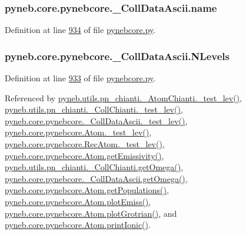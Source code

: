 \hypertarget{classpyneb_1_1core_1_1pynebcore_1_1___coll_data_ascii_a39c9697691d3e8e8d7f99c05e0baa4a9}{
\subsubsection[{name}]{\setlength{\rightskip}{0pt plus 5cm}pyneb.\-core.\-pynebcore.\-\_\-\-Coll\-Data\-Ascii.\-name}}\label{classpyneb_1_1core_1_1pynebcore_1_1___coll_data_ascii_a39c9697691d3e8e8d7f99c05e0baa4a9}


Definition at line \hyperlink{pynebcore_8py_source_l00934}{934} of file \hyperlink{pynebcore_8py_source}{pynebcore.\-py}.

\hypertarget{classpyneb_1_1core_1_1pynebcore_1_1___coll_data_ascii_a718c85715ee6ef5dfdd4136e2031030b}{
\subsubsection[{N\-Levels}]{\setlength{\rightskip}{0pt plus 5cm}pyneb.\-core.\-pynebcore.\-\_\-\-Coll\-Data\-Ascii.\-N\-Levels}}\label{classpyneb_1_1core_1_1pynebcore_1_1___coll_data_ascii_a718c85715ee6ef5dfdd4136e2031030b}


Definition at line \hyperlink{pynebcore_8py_source_l00933}{933} of file \hyperlink{pynebcore_8py_source}{pynebcore.\-py}.



Referenced by \hyperlink{pn__chianti_8py_source_l00304}{pyneb.\-utils.\-pn\-\_\-chianti.\-\_\-\-Atom\-Chianti.\-\_\-test\-\_\-lev()}, \hyperlink{pn__chianti_8py_source_l00472}{pyneb.\-utils.\-pn\-\_\-chianti.\-\_\-\-Coll\-Chianti.\-\_\-test\-\_\-lev()}, \hyperlink{pynebcore_8py_source_l01045}{pyneb.\-core.\-pynebcore.\-\_\-\-Coll\-Data\-Ascii.\-\_\-test\-\_\-lev()}, \hyperlink{pynebcore_8py_source_l01525}{pyneb.\-core.\-pynebcore.\-Atom.\-\_\-test\-\_\-lev()}, \hyperlink{pynebcore_8py_source_l02672}{pyneb.\-core.\-pynebcore.\-Rec\-Atom.\-\_\-test\-\_\-lev()}, \hyperlink{pynebcore_8py_source_l01782}{pyneb.\-core.\-pynebcore.\-Atom.\-get\-Emissivity()}, \hyperlink{pn__chianti_8py_source_l00507}{pyneb.\-utils.\-pn\-\_\-chianti.\-\_\-\-Coll\-Chianti.\-get\-Omega()}, \hyperlink{pynebcore_8py_source_l01082}{pyneb.\-core.\-pynebcore.\-\_\-\-Coll\-Data\-Ascii.\-get\-Omega()}, \hyperlink{pynebcore_8py_source_l01562}{pyneb.\-core.\-pynebcore.\-Atom.\-get\-Populations()}, \hyperlink{pynebcore_8py_source_l02384}{pyneb.\-core.\-pynebcore.\-Atom.\-plot\-Emiss()}, \hyperlink{pynebcore_8py_source_l02443}{pyneb.\-core.\-pynebcore.\-Atom.\-plot\-Grotrian()}, and \hyperlink{pynebcore_8py_source_l02233}{pyneb.\-core.\-pynebcore.\-Atom.\-print\-Ionic()}.

